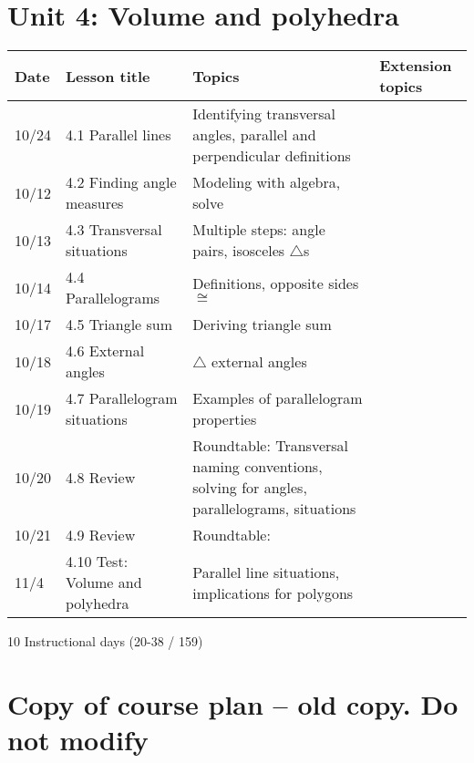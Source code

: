 \section*{Unit 4: Volume and polyhedra}
\begin{tabular}{|p{0.9cm}|p{4cm}|p{7cm}|p{5cm}|}
  \hline
  Date & Lesson title & Topics  & Extension topics \\
  \hline
  10/24 & 4.1 Parallel lines & Identifying transversal angles, parallel and perpendicular definitions &  \\
  \hline
  10/12 & 4.2 Finding angle measures & Modeling with algebra, solve &  \\
  \hline
  10/13 & 4.3 Transversal situations & Multiple steps: angle pairs, isosceles $\triangle$s &  \\
  \hline
  10/14 & 4.4 Parallelograms & Definitions, opposite sides $\cong$ &  \\
  \hline
  10/17 & 4.5 Triangle sum & Deriving triangle sum &  \\
  \hline
  10/18 & 4.6 External angles & $\triangle$ external angles & \\
  \hline
  10/19 & 4.7 Parallelogram situations & Examples of parallelogram properties &  \\
  \hline
  10/20 & 4.8 Review & Roundtable: Transversal naming conventions, solving for angles, parallelograms, situations & \\
  \hline
  10/21 & 4.9 Review & Roundtable: &  \\
  \hline
  11/4 & 4.10 Test: Volume and polyhedra & Parallel line situations, implications for polygons &  \\
  \hline

\end{tabular} \par \vspace*{0.3cm}
10 Instructional days (20-38 / 159)


\newpage
\section*{Copy of course plan -- old copy. Do not modify}

